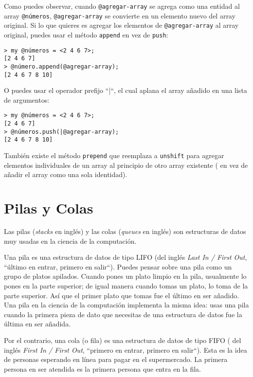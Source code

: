 Como puedes observar, cuando \verb|@agregar-array| se agrega
como una entidad al array \verb|@números|, \verb|@agregar-array|
se convierte en un elemento nuevo del array original. Si lo que 
quieres es agregar los elementos de \verb|@agregar-array| 
al array original, puedes usar el método {\tt append} en vez 
de {\tt push}:

\begin{verbatim}
> my @números = <2 4 6 7>;
[2 4 6 7]
> @número.append(@agregar-array);
[2 4 6 7 8 10]
\end{verbatim}

O puedes usar el operador prefijo ``|``, el cual aplana
el array añadido en una lista de argumentos:

\begin{verbatim}
> my @números = <2 4 6 7>;
[2 4 6 7]
> @números.push(|@agregar-array);
[2 4 6 7 8 10]
\end{verbatim}

También existe el método {\tt prepend} que reemplaza 
a {\tt unshift} para agregar elementos individuales 
de un array al principio de otro array existente (
en vez de añadir el array como una sola identidad).

\section{Pilas y Colas}
\label{stacks_queues}

Las pilas (\emph{stacks} en inglés) y las colas ({\emph{queues} en inglés}) son 
estructuras de datos muy usadas en la ciencia de la computación.

Una pila es una estructura de datos de tipo LIFO (del inglés 
\emph{Last In / First Out}, ``último en entrar, primero en salir``).
Puedes pensar sobre una pila como un grupo de platos apilados. Cuando
pones un plato limpio en la pila, usualmente lo pones en la parte superior;
de igual manera cuando tomas un plato, lo toma de la parte superior.
Así que el primer plato que tomas fue el último en ser añadido. Una pila
en la ciencia de la computación implementa la misma idea: usas una pila
cuando la primera pieza de dato que necesitas de una estructura de datos fue
la última en ser añadida.

Por el contrario, una cola (o fila) es una estructura de datos de tipo FIFO (
del inglés \emph{First In / First Out}, ``primero en entrar, primero en
salir``). Esta es la idea de personas esperando en línea para pagar en el
supermercado. La primera persona en ser atendida es la primera
persona que entra en la fila.

